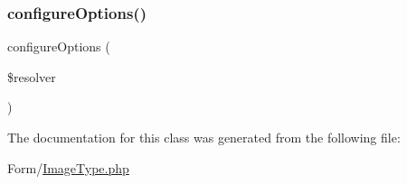 \mbox{\label{class_app_1_1_form_1_1_image_type_a8ff68a86f5090b5df973286836e46ead}} 
\subsubsection{\texorpdfstring{configureOptions()}{configureOptions()}}
{\footnotesize\ttfamily configure\+Options (\begin{DoxyParamCaption}\item[{Options\+Resolver}]{\$resolver }\end{DoxyParamCaption})}



The documentation for this class was generated from the following file\+:\begin{DoxyCompactItemize}
\item 
Form/\mbox{\hyperlink{_image_type_8php}{Image\+Type.\+php}}\end{DoxyCompactItemize}
